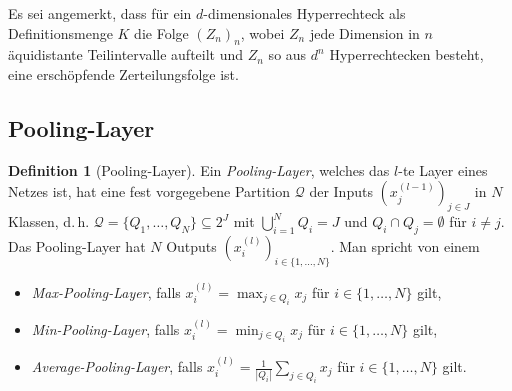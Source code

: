 \documentclass[paper=a4, 	%
		fontsize=11pt,
		abstract=true, 	%
		headsepline, 	%
		notitlepage	%
		]{scrartcl}
\theoremstyle{definition}
\newtheorem{definition}[theorem]{Definition}
\newcommand{\abs}[1]{\left\lvert#1\right\rvert}
\begin{document}
Es sei angemerkt, dass für ein $d$-dimensionales Hyperrechteck als Definitionsmenge $K$ die Folge $(Z_n)_n$, wobei $Z_n$ jede Dimension in $n$ äquidistante Teilintervalle aufteilt und $Z_n$ so aus $d^n$ Hyperrechtecken besteht, eine erschöpfende Zerteilungsfolge ist. 


\subsection{Pooling-Layer}

\begin{definition}[Pooling-Layer]
    Ein \emph{Pooling-Layer}, welches das $l$-te Layer eines Netzes ist, hat eine fest vorgegebene Partition $\mathcal{Q}$ der Inputs $(x^{(l-1)}_j)_{j \in J}$ in $N$ Klassen, d.\,h. $\mathcal{Q}=\{ Q_1,\dots,Q_N \}\subseteq 2^J$ mit $\bigcup_{i=1}^N Q_i = J$ und $Q_i\cap Q_j = \emptyset$ für $i\neq j$.
    Das Pooling-Layer hat $N$ Outputs $(x^{(l)}_i)_{i\in\{1,\dots, N\}}$. Man spricht von einem 
    \begin{itemize}
    \item \emph{Max-Pooling-Layer}, falls $x^{(l)}_i = \max_{ j\in Q_i } x_j$ für $i\in\{1,\dots,N\}$ gilt,
    \item \emph{Min-Pooling-Layer}, falls $x^{(l)}_i = \min_{ j\in Q_i } x_j$ für $i\in\{1,\dots,N\}$ gilt,
    \item \emph{Average-Pooling-Layer}, falls $x^{(l)}_i = \frac{1}{\abs{Q_i}} \sum_{j\in Q_i} x_j$ für $i\in\{1,\dots,N\}$ gilt.
    \end{itemize}

\end{definition}


\begin{figure}
    \centering
    \begin{minipage}{.45\textwidth}
      \centering
      
      \label{fig:abstract-pooling-layer}
    \end{minipage}%
    \begin{minipage}{.55\textwidth}
        \centering
        
        \label{fig:pooling-mnist}
    \end{minipage}
\end{figure}
\end{document}
